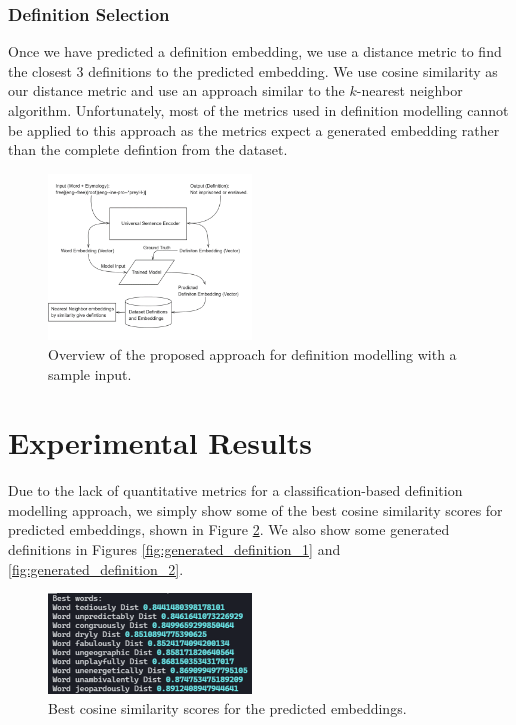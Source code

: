 \documentclass[11pt,a4paper]{article}
\begin{document}
\subsubsection{Definition Selection}
Once we have predicted a definition embedding, we use a distance metric to find
the closest 3 definitions to the predicted embedding. We use cosine similarity
as our distance metric and use an approach similar to the $k$-nearest neighbor
algorithm. Unfortunately, most of the metrics used in definition modelling
cannot be applied to this approach as the metrics expect a generated embedding
rather than the complete defintion from the dataset.

\begin{figure}
  \centering
  \includegraphics[width=0.48\textwidth]{assets/proposed_approach.png}
  \caption{Overview of the proposed approach for definition modelling with a
    sample input.}
  \label{fig:proposed_approach}
\end{figure}

\section{Experimental Results}
Due to the lack of quantitative metrics for a classification-based definition
modelling approach, we simply show some of the best cosine similarity scores for
predicted embeddings, shown in Figure \ref{fig:best_words}. We also show some
generated definitions in Figures \ref{fig:generated_definition_1} and
\ref{fig:generated_definition_2}.

\begin{figure}
  \centering
  \includegraphics[width=0.48\textwidth]{assets/best_words.png}
  \caption{Best cosine similarity scores for the predicted embeddings.}
  \label{fig:best_words}
\end{figure}
\end{document}
